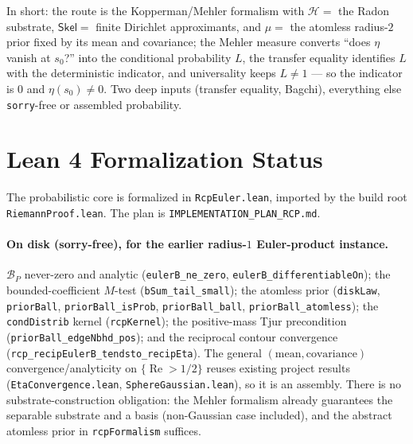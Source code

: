 \documentclass[11pt,a4paper]{article}
\theoremstyle{definition}
\newcommand{\Rea}{\operatorname{Re}}
\begin{document}
\noindent In short: the route is the Kopperman/Mehler formalism with \(\mathcal{H}=\) the
Radon substrate, \(\mathsf{Skel}=\) finite Dirichlet approximants, and \(\mu=\) the atomless
radius-\(2\) prior fixed by its mean and covariance; the Mehler measure converts ``does
\(\eta\) vanish at \(s_0\)?'' into the conditional probability \(L\), the transfer equality
identifies \(L\) with the deterministic indicator, and universality keeps \(L\neq1\) --- so
the indicator is \(0\) and \(\eta(s_0)\neq0\). Two deep inputs (transfer equality, Bagchi),
everything else \texttt{sorry}-free or assembled probability.

\section{Lean 4 Formalization Status}\label{sec:status}

The probabilistic core is formalized in \texttt{RcpEuler.lean}, imported by the build root
\texttt{RiemannProof.lean}. The plan is \texttt{IMPLEMENTATION\_PLAN\_RCP.md}.

\paragraph{On disk (sorry-free), for the earlier radius-\(1\) Euler-product instance.}
\(\mathcal{B}_P\) never-zero and analytic (\texttt{eulerB\_ne\_zero},
\texttt{eulerB\_differentiableOn}); the bounded-coefficient \(M\)-test
(\texttt{bSum\_tail\_small}); the atomless prior (\texttt{diskLaw}, \texttt{priorBall},
\texttt{priorBall\_isProb}, \texttt{priorBall\_ball}, \texttt{priorBall\_atomless}); the
\texttt{condDistrib} kernel (\texttt{rcpKernel}); the positive-mass Tjur precondition
(\texttt{priorBall\_edgeNbhd\_pos}); and the reciprocal contour convergence
(\texttt{rcp\_recipEulerB\_tendsto\_recipEta}). The general
\((\text{mean},\text{covariance})\) convergence/analyticity on \(\{\Rea>1/2\}\) reuses
existing project results (\texttt{EtaConvergence.lean}, \texttt{SphereGaussian.lean}), so it
is an assembly. There is no substrate-construction obligation: the Mehler formalism already
guarantees the separable substrate and a basis (non-Gaussian case included), and the
abstract atomless prior in \texttt{rcpFormalism} suffices.
\end{document}
